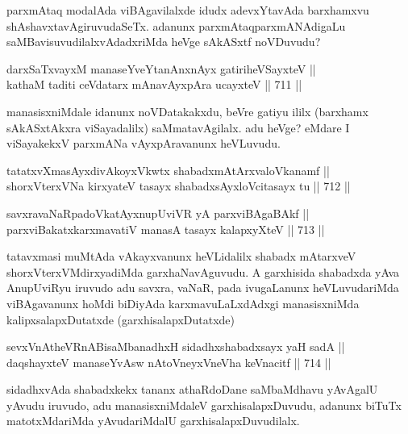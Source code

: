 \begin{artha} 
parxmAtaq modalAda viBAgavilalxde idudx adevxYtavAda barxhamxvu 
shAshavxtavAgiruvudaSeTx. adanunx parxmAtaqparxmANAdigaLu 
saMBavisuvudilalxvAdadxriMda heVge sAkASxtf noVDuvudu?
\end{artha}


\begin{shl}
darxSaTxvayxM manaseYveYtanAnxnAyx gatiriheVSayxteV || \\
kathaM taditi ceVdatarx mAnavAyxpAra ucayxteV \hfill || 711 ||  
\end{shl}

\begin{artha} 
manasisxniMdale idanunx noVDatakakxdu, beVre gatiyu ililx (barxhamx sAkASxtAkxra viSayadalilx) saMmatavAgilalx. adu heVge? eMdare I viSayakekxV parxmANa vAyxpAravanunx heVLuvudu.
\end{artha}

\begin{shl}
tatatxvXmasAyxdivAkoyxVkwtx shabadxmAtArxvaloVkanamf || \\
shorxVterxVNa kirxyateV tasayx shabadxsAyx\s \s loVcitasayx tu \hfill || 712 ||  
\end{shl}
				
\begin{shl}
savxravaNaRpadoVkatAyx\s \s nupUviVR yA parxviBAgaBAkf || \\
parxviBakatxkarxmavatiV manasA tasayx kalapxyXteV \hfill || 713 ||  
\end{shl}

\begin{artha} 
tatavxmasi muMtAda vAkayxvanunx heVLidalilx shabadx mAtarxveV 
shorxVterxVMdirxyadiMda garxhaNavAguvudu. A garxhisida shabadxda yAva 
AnupUviRyu iruvudo adu savxra, vaNaR, pada ivugaLanunx heVLuvudariMda 
viBAgavanunx hoMdi biDiyAda karxmavuLaLxdAdxgi manasisxniMda 
kalipxsalapxDutatxde (garxhisalapxDutatxde)
\end{artha}

\begin{shl}
sevxVnAtheVRnABisaMbanadhxH sidadhxshabadxsayx yaH sadA || \\
daqshayxteV manaseYvAsw nAtoV\s neyxVneVha keVnacitf \hfill || 714 ||  
\end{shl}

\begin{artha} 
sidadhxvAda shabadxkekx tananx athaRdoDane saMbaMdhavu yAvAgalU yAvudu 
iruvudo, adu manasisxniMdaleV garxhisalapxDuvudu, adanunx biTuTx 
matotxMdariMda yAvudariMdalU garxhisalapxDuvudilalx.
\end{artha}

